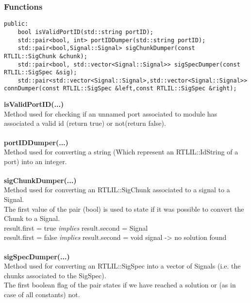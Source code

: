 \documentclass{article}
\begin{document}
\subsubsection{Functions}

\begin{mdframed}[hidealllines=true, backgroundcolor=magenta!10]
	\begin{lstlisting}[basicstyle=\tiny]
public:
	bool isValidPortID(std::string portID);
	std::pair<bool, int> portIDDumper(std::string portID);
	std::pair<bool,Signal::Signal> sigChunkDumper(const RTLIL::SigChunk &chunk);
	std::pair<bool, std::vector<Signal::Signal>> sigSpecDumper(const RTLIL::SigSpec &sig);
	std::pair<std::vector<Signal::Signal>,std::vector<Signal::Signal>> connDumper(const RTLIL::SigSpec &left,const RTLIL::SigSpec &right);
	\end{lstlisting}
\end{mdframed}

\textbf{isValidPortID(...)}\\
Method used for checking if an unnamed port associated to module has associated a valid id (return true) or not(return false).\\\\

\textbf{portIDDumper(...)}\\
Method used for converting a string (Which represent an RTLIL::IdString of a port) into an integer.\\\\

\textbf{sigChunkDumper(...)}\\
 Method used for converting an RTLIL::SigChunk associated to a signal to a Signal.\\
 The first value of the pair (bool) is used to state if it was possible to convert
 the Chunk to a Signal.\\
 result.first = true \textit{implies} result.second = Signal\\
 result.first = false \textit{implies} result.second = void signal -> no solution found\\\\
 
 \textbf{sigSpecDumper(...)}\\
 Method used for converting an RTLIL::SigSpec into a vector of Signals (i.e. the chunks associated to the SigSpec).\\
 The first boolean flag of the pair states if we have reached a solution or (as in case of all constants) not.\\\\
 
\end{document}
